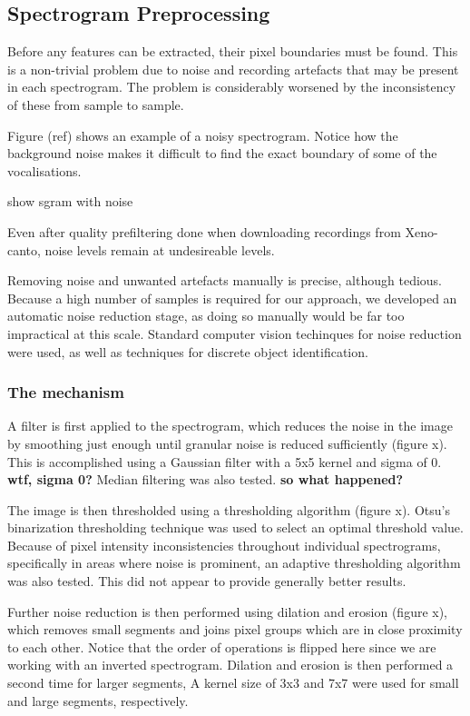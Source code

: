 \subsection{Spectrogram Preprocessing}\label{sec:preproc}

Before any features can be extracted, their pixel boundaries must be found.
This is a non-trivial problem due to noise and recording artefacts
that may be present in each spectrogram.
The problem is considerably worsened by the inconsistency of these from sample
to sample.

Figure (ref) shows an example of a noisy spectrogram.
Notice how the background noise makes it difficult to find the exact boundary of
some of the vocalisations.

show sgram with noise

Even after quality prefiltering done when downloading recordings from
Xeno-canto, noise levels remain at undesireable levels.

Removing noise and unwanted artefacts manually is precise, although tedious.
Because a high number of samples is required for our approach, we developed an
automatic noise reduction stage, as doing so manually would be far too
impractical at this scale.
Standard computer vision techinques for noise reduction were used, as well as
techniques for discrete object identification.

\subsubsection{The mechanism}
A filter is first applied to the spectrogram, which reduces the noise in the
image by smoothing just enough until granular noise is reduced sufficiently
(figure x).
This is accomplished using a Gaussian filter with a 5x5 kernel and sigma of 0.
\textbf{wtf, sigma 0?}
Median filtering was also tested. \textbf{so what happened?}

The image is then thresholded using a thresholding algorithm (figure x).
Otsu's binarization thresholding technique was used to select an optimal
threshold value.
Because of pixel intensity inconsistencies throughout individual spectrograms,
specifically in areas where noise is prominent, an adaptive thresholding
algorithm was also tested.
This did not appear to provide generally better results.

Further noise reduction is then performed using dilation and erosion (figure x),
which removes small segments and joins pixel groups which are in close proximity
to each other.
Notice that the order of operations is flipped here since we are working with
an inverted spectrogram.
Dilation and erosion is then performed a second time for larger segments,
A kernel size of 3x3 and 7x7 were used for small and large segments, respectively.

